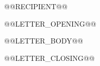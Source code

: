 \documentclass[11pt]{letter}
\begin{document}
\begin{letter}{@@RECIPIENT@@}
\opening{@@LETTER_OPENING@@}

@@LETTER_BODY@@

\closing{@@LETTER_CLOSING@@}
\end{letter}
\end{document}
